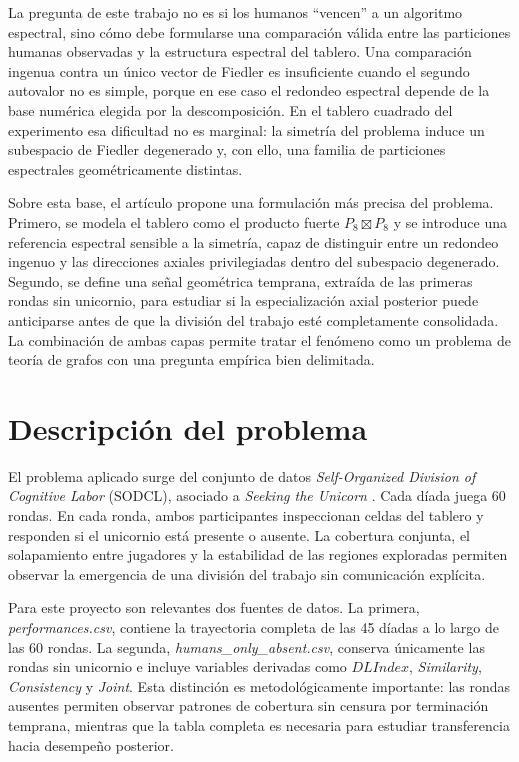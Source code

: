 \documentclass[journal]{IEEEtran}
\begin{document}
La pregunta de este trabajo no es si los humanos ``vencen'' a un algoritmo espectral, sino cómo debe formularse una comparación válida entre las particiones humanas observadas y la estructura espectral del tablero. Una comparación ingenua contra un único vector de Fiedler es insuficiente cuando el segundo autovalor no es simple, porque en ese caso el redondeo espectral depende de la base numérica elegida por la descomposición. En el tablero cuadrado del experimento esa dificultad no es marginal: la simetría del problema induce un subespacio de Fiedler degenerado y, con ello, una familia de particiones espectrales geométricamente distintas.

Sobre esta base, el artículo propone una formulación más precisa del problema. Primero, se modela el tablero como el producto fuerte $P_8 \boxtimes P_8$ y se introduce una referencia espectral sensible a la simetría, capaz de distinguir entre un redondeo ingenuo y las direcciones axiales privilegiadas dentro del subespacio degenerado. Segundo, se define una señal geométrica temprana, extraída de las primeras rondas sin unicornio, para estudiar si la especialización axial posterior puede anticiparse antes de que la división del trabajo esté completamente consolidada. La combinación de ambas capas permite tratar el fenómeno como un problema de teoría de grafos con una pregunta empírica bien delimitada.

\section{Descripción del problema}

El problema aplicado surge del conjunto de datos \emph{Self-Organized Division of Cognitive Labor} (SODCL), asociado a \emph{Seeking the Unicorn} \cite{andrade2021}. Cada díada juega 60 rondas. En cada ronda, ambos participantes inspeccionan celdas del tablero y responden si el unicornio está presente o ausente. La cobertura conjunta, el solapamiento entre jugadores y la estabilidad de las regiones exploradas permiten observar la emergencia de una división del trabajo sin comunicación explícita.

Para este proyecto son relevantes dos fuentes de datos. La primera, \emph{performances.csv}, contiene la trayectoria completa de las 45 díadas a lo largo de las 60 rondas. La segunda, \emph{humans\_only\_absent.csv}, conserva únicamente las rondas sin unicornio e incluye variables derivadas como $DLIndex$, \emph{Similarity}, \emph{Consistency} y \emph{Joint}. Esta distinción es metodológicamente importante: las rondas ausentes permiten observar patrones de cobertura sin censura por terminación temprana, mientras que la tabla completa es necesaria para estudiar transferencia hacia desempeño posterior.
\end{document}
